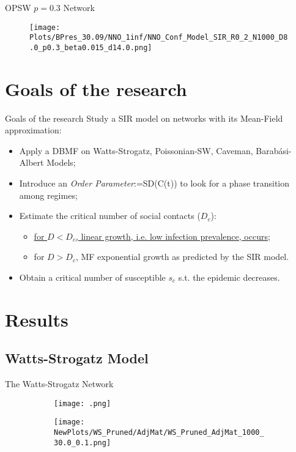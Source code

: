\documentclass{beamer}
\begin{document}
\begin{frame}{OPSW $p = 0.3$  Network}
	\begin{figure}
		\texttt{[image: Plots/BPres\_30.09/NNO\_1inf/NNO\_Conf\_Model\_SIR\_R0\_2\_N1000\_D8.0\_p0.3\_beta0.015\_d14.0.png]} %
	\end{figure}
\end{frame}

\section{Goals of the research}
\begin{frame}{Goals of the research}
\centering
Study a SIR model on networks with its Mean-Field approximation:
\begin{itemize}
	\item Apply a DBMF on Watts-Strogatz, Poissonian-SW, Caveman, Barabási-Albert Models;
	\item Introduce an \textit{Order Parameter}:=SD(C(t)) to look for a phase transition among regimes;
	\item Estimate the critical number of social contacts ($D_c$):
	\begin{itemize}
		\item \underline{for $D<D_c$, linear growth, i.e. low infection prevalence, occurs};
		\vspace{2mm }
		\item for $D>D_c$, MF exponential growth as predicted by the SIR model.
	\end{itemize}
	\item Obtain a critical number of susceptible $s_c$  s.t. the epidemic decreases.
\end{itemize}
\end{frame}

\section{Results}
\subsection{Watts-Strogatz Model} %
\begin{frame}{The Watts-Strogatz Network}
\begin{figure}
	\begin{subfigure}{.4\linewidth}
		\texttt{[image: .png]}
	\end{subfigure}
	\vspace{3mm}
	\begin{subfigure}{.6\linewidth}
		\texttt{[image: NewPlots/WS\_Pruned/AdjMat/WS\_Pruned\_AdjMat\_1000\_30.0\_0.1.png]} %
	\end{subfigure}%
\end{figure}
\end{frame}
\end{document}
